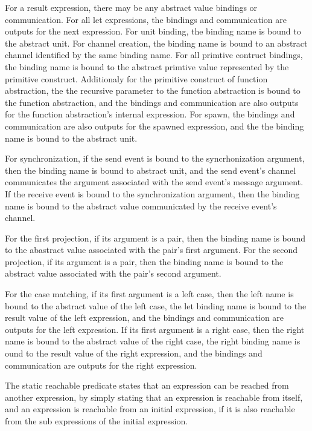 \documentclass{article}
\begin{document}
For a result expression, there may be any abstract value bindings or communication. For all let
expressions, the bindings and communication are outputs for the next expression. For unit
binding, the binding name is bound to the abstract unit. For channel creation, the binding name
is bound to an abstract channel identified by the same binding name. For all primtive contruct
bindings, the binding name is bound to the abstract primtive value represented by the primitive
construct.  Additionaly for the primitive construct of function abstraction, the the recursive
parameter to the function abstraction is bound to the function abstraction, and the bindings
and communication are also outputs for the function abstraction's internal expression. For
spawn, the bindings and communication are also outputs for the spawned expression, and the the
binding name is bound to the abstract unit.

For synchronization, if the send event is bound to the syncrhonization argument, then the
binding name is bound to abstract unit, and the send event's channel communicates the argument
associated with the send event's message argument.  If the receive event is bound to the
synchronization argument, then the binding name is bound to the abstract value communicated by
the receive event's channel.

For the first projection, if its argument is a pair, then the binding name is bound to the
abastract value associated with the pair's first argument.  For the second projection, if its
argument is a pair, then the binding name is bound to the abstract value associated with the
pair's second argument.  

For the case matching, if its first argument is a left case, then the left name is bound to the
abstract value of the left case, the let binding name is bound to the result value of the left
expression, and the bindings and communication are outputs for the left expression.  If its
first argument is a right case, then the right name is bound to the abstract value of the right
case, the right binding name is ound to the result value of the right expression, and the
bindings and communication are outputs for the right expression. 

The static reachable predicate states that an expression can be reached from another
expression, by simply stating that an expression is reachable from itself,  and an expression
is reachable from an initial expression, if it is also reachable from the sub expressions of
the initial expression.  
\end{document}
